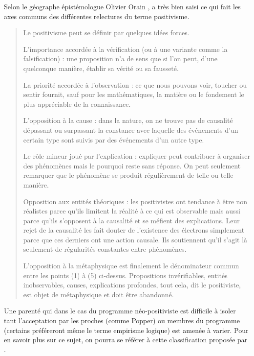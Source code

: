 Selon le géographe épistémologue Olivier Orain , \textcite{Hacking1989} a très bien saisi ce qui fait les axes communs des différentes relectures du terme positivisme.

\blockquote[{\cite[82]{Hacking1989}}]{Le positivisme peut se définir par quelques idées forces. \begin{enumerate*}[label=(\arabic*)] \item L’importance accordée à la vérification (ou à une variante comme la falsification) : une proposition n’a de sens que si l’on peut, d’une quelconque manière, établir sa vérité ou sa fausseté. \item La priorité accordée à l’observation : ce que nous pouvons voir, toucher ou sentir fournit, sauf pour les mathématiques, la matière ou le fondement le plus appréciable de la connaissance. \item L’opposition à la cause : dans la nature, on ne trouve pas de causalité dépassant ou surpassant la constance avec laquelle des événements d’un certain type sont suivis par des événements d’un autre type. \item Le rôle mineur joué par l’explication : expliquer peut contribuer à organiser des phénomènes mais le pourquoi reste sans réponse. On peut seulement remarquer que le phénomène se produit régulièrement de telle ou telle manière. \item Opposition aux entités théoriques : les positivistes ont tendance à être non réalistes parce qu’ils limitent la réalité à ce qui est observable mais aussi parce qu’ils s’opposent à la causalité et se méfient des explications. Leur rejet de la causalité les fait douter de l’existence des électrons simplement parce que ces derniers ont une action causale. Ils soutiennent qu’il s’agit là seulement de régularités constantes entre phénomènes. \item L’opposition à la métaphysique est finalement le dénominateur commun entre les points (1) à (5) ci-dessus. Propositions invérifiables, entités inobservables, causes, explications profondes, tout cela, dit le positiviste, est objet de métaphysique et doit être abandonné.\end{enumerate*}}

Une parenté qui dans le cas du programme néo-positiviste est difficile à isoler tant l'acceptation par les proches (comme Popper) ou membres du programme (certains préféreront même le terme empirisme logique) est amenée à varier. Pour en savoir plus sur ce sujet, on pourra se référer à cette classification proposée par \textcite[81-86]{Hacking1989}.

